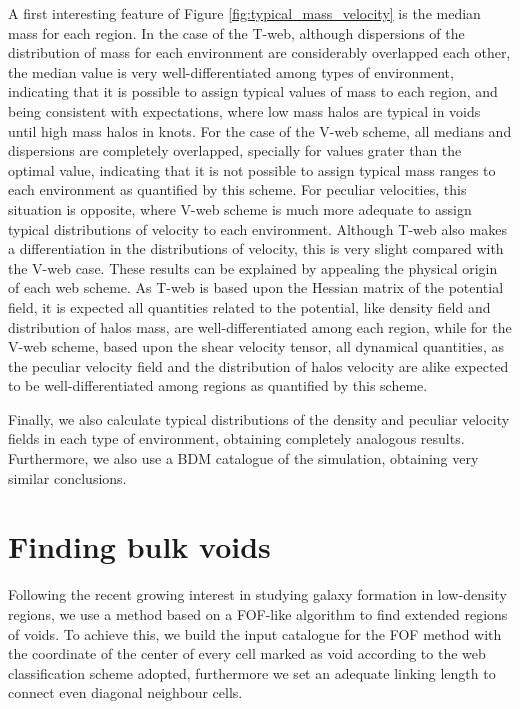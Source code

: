 \documentclass[a4,useAMS,usenatbib,usegraphicx]{latex/mn2e}
\begin{document}
A first interesting feature of Figure  \ref{fig:typical_mass_velocity} is 
the median mass for each region. In the case of the T-web, although 
dispersions of the distribution of mass for each environment are 
considerably overlapped each other, the median value is very 
well-differentiated among types of environment, indicating that it is 
possible to assign typical values of mass to each region, and being 
consistent with expectations, where low mass halos are typical in voids 
until high mass halos in knots. For the case of the V-web scheme, all
medians and dispersions are completely overlapped, specially for values 
grater than the optimal \lth value, indicating that it is not possible to
assign typical mass ranges to each environment as quantified by this 
scheme. For peculiar velocities, this situation is opposite, where V-web
scheme is much more adequate to assign typical distributions of velocity
to each environment. Although T-web also makes a differentiation in the 
distributions of velocity, this is very slight compared with the V-web 
case. These results can be explained by appealing the physical origin of 
each web scheme. As T-web is based upon the Hessian matrix of the potential
field, it is expected all quantities related to the potential, like density
field and distribution of halos mass, are well-differentiated among each 
region, while for the V-web scheme, based upon the shear velocity tensor, 
all dynamical quantities, as the peculiar velocity field and the 
distribution of halos velocity are alike expected to be 
well-differentiated among regions as quantified by this scheme.



Finally, we also calculate typical distributions of the density and 
peculiar velocity fields in each type of environment, obtaining completely 
analogous results. Furthermore, we also use a BDM catalogue of the 
simulation, obtaining very similar conclusions.



\section{Finding bulk voids}
\label{sec:bulk_voids}


Following the recent growing interest in studying galaxy formation in 
low-density regions, we use a method based on a FOF-like algorithm to 
find extended regions of voids. To achieve this, we build the input 
catalogue for the FOF method with the coordinate of the center of every 
cell marked as void according to the web classification scheme adopted, 
furthermore we set an adequate linking length to connect even diagonal 
neighbour cells.
\end{document}
